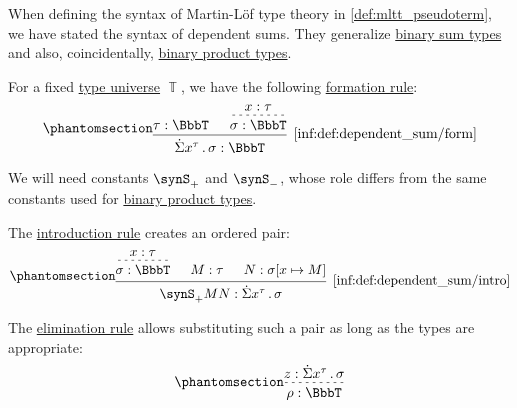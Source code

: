 \begin{definition}\label{def:dependent_sum}
  When defining the syntax of Martin-L\"of type theory in \cref{def:mltt_pseudoterm}, we have stated the syntax of dependent sums. They generalize \hyperref[def:simple_sum_type]{binary sum types} and also, coincidentally, \hyperref[def:simple_product_type]{binary product types}.

  For a fixed \hyperref[con:type_universe]{type universe} \( \BbbT \), we have the following \hyperref[rem:type_theory_rule_classification/form]{formation rule}:
  \begin{equation*}\taglabel[\ensuremath{ \Sigma_{\logic{form}} }]{inf:def:dependent_sum/form}
    \begin{prooftree}
      \hypo{ \tau: \BbbT }

      \hypo{ x: \tau }
      \infer[dashed]1{ \sigma: \BbbT }

      \infer2[\ref{inf:def:dependent_sum/form}]{ \qsum {x^\tau} \sigma: \BbbT }
    \end{prooftree}
  \end{equation*}

  We will need constants \( \synS_+ \) and \( \synS_- \), whose role differs from the same constants used for \hyperref[def:simple_product_type]{binary product types}.

  The \hyperref[rem:type_theory_rule_classification/intro]{introduction rule} creates an ordered pair:
  \begin{equation*}\taglabel[\ensuremath{ \Sigma_+ }]{inf:def:dependent_sum/intro}
    \begin{prooftree}
      \hypo{ x: \tau }
      \infer[dashed]1{ \sigma: \BbbT }

      \hypo{ M: \tau }
      \hypo{ N: \sigma[x \mapsto M] }

      \infer3[\ref{inf:def:dependent_sum/intro}]{ \synS_+ M N: \qsum {x^\tau} \sigma }
    \end{prooftree}
  \end{equation*}

  The \hyperref[rem:type_theory_rule_classification/elim]{elimination rule} allows substituting such a pair as long as the types are appropriate:
  \begin{equation*}\taglabel[\ensuremath{ \Sigma_- }]{inf:def:dependent_sum/elim}
    \begin{prooftree}
      \hypo{ z: \qsum {x^\tau} \sigma }
      \infer[dashed]1{ \rho: \BbbT }


\end{prooftree}
\end{equation*}
\end{definition}
